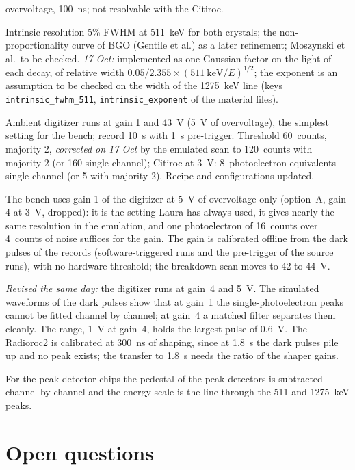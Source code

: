 \documentclass[11pt]{article}
\newcommand{\code}[1]{\texttt{#1}}
\newcommand{\us}{\textmu s\xspace}
\begin{document}
\begin{description}
  overvoltage, 100~ns; not resolvable with the Citiroc.
\item[16 Oct 2026] Intrinsic resolution 5\% FWHM at 511~keV for both
  crystals; the non-proportionality curve of BGO (Gentile et al.) as a
  later refinement; Moszynski et al.\ to be checked. \emph{17 Oct:}
  implemented as one Gaussian factor on the light of each decay, of
  relative width $0.05/2.355 \times (511~\mathrm{keV}/E)^{1/2}$; the
  exponent is an assumption to be checked on the width of the 1275~keV line
  (keys \code{intrinsic\_fwhm\_511}, \code{intrinsic\_exponent} of the
  material files).
\item[16 Oct 2026] Ambient digitizer runs at gain 1 and 43~V (5~V of
  overvoltage), the simplest setting for the bench; record 10~\us with
  1~\us pre-trigger. Threshold 60~counts, majority 2, \emph{corrected on
  17 Oct} by the emulated scan to 120~counts with majority 2 (or 160
  single channel); Citiroc at 3~V: 8~photoelectron-equivalents single
  channel (or 5 with majority 2). Recipe and configurations updated.
\item[18 Oct 2026] The bench uses gain 1 of the digitizer at 5~V of
  overvoltage only (option~A, gain 4 at 3~V, dropped): it is the setting
  Laura has always used, it gives nearly the same resolution in the
  emulation, and one photoelectron of 16~counts over 4~counts of noise
  suffices for the gain. The gain is calibrated offline from the dark
  pulses of the records (software-triggered runs and the pre-trigger of the
  source runs), with no hardware threshold; the breakdown scan moves to 42
  to 44~V.
\item[18 Oct 2026] \emph{Revised the same day:} the digitizer runs at
  gain~4 and 5~V. The simulated waveforms of the dark pulses show that at
  gain~1 the single-photoelectron peaks cannot be fitted channel by
  channel; at gain~4 a matched filter separates them cleanly. The range,
  1~V at gain~4, holds the largest pulse of 0.6~V. The Radioroc2 is
  calibrated at 300~ns of shaping, since at 1.8~\us the dark pulses pile
  up and no peak exists; the transfer to 1.8~\us needs the ratio of the
  shaper gains.
\item[18 Oct 2026] For the peak-detector chips the pedestal of the peak
  detectors is subtracted channel by channel and the energy scale is the
  line through the 511 and 1275~keV peaks.
\end{description}

\section{Open questions}
\end{document}
